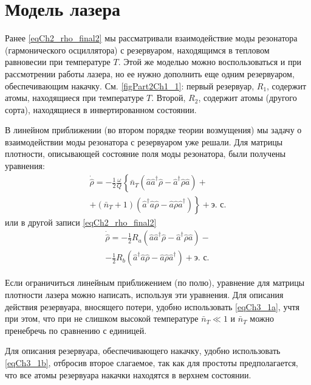 \section{Модель лазера}

Ранее \eqref{eqCh2_rho_final2} мы рассматривали взаимодействие моды резонатора
(гармонического осциллятора) с резервуаром, находящимся в тепловом
равновесии при температуре  $T$.  Этой же моделью можно воспользоваться
и при рассмотрении работы лазера, но ее нужно дополнить еще одним
резервуаром, обеспечивающим накачку.  
См. \autoref{figPart2Ch1_1}: первый резервуар, $R_1$, содержит атомы,
находящиеся при температуре  $T$.  Второй, $R_2$, содержит атомы (другого
сорта), находящиеся в инвертированном состоянии. 



В линейном приближении (во втором порядке теории возмущения) мы задачу
о взаимодействии моды резонатора с резервуаром уже решали. Для матрицы
плотности, описывающей состояние поля моды резонатора, были получены
уравнения:  
\begin{eqnarray}
\dot{\hat{\rho}} =
- \frac{1}{2}\frac{\omega}{Q}\left\{
\bar{n}_T\left(\hat{a}\hat{a}^{\dag}\hat{\rho} - 
\hat{a}^{\dag}\hat{\rho}\hat{a}
\right)\right.
+ 
\nonumber \\
\left.
+ \left(\bar{n}_T + 1\right)
\left(\hat{a}^{\dag}\hat{a}\hat{\rho} - 
\hat{a}\hat{\rho}\hat{a}^{\dag}
\right)
\right\}
 + \mbox{э. с.}
\label{eqCh3_1a}
\end{eqnarray}
или в другой записи \eqref{eqCh2_rho_final2}
\begin{eqnarray}
\dot{\hat{\rho}} =
- \frac{1}{2}R_a
\left(\hat{a}\hat{a}^{\dag}\hat{\rho} - 
\hat{a}^{\dag}\hat{\rho}\hat{a}
\right)
- 
\nonumber \\
- \frac{1}{2}R_b
\left(\hat{a}^{\dag}\hat{a}\hat{\rho} - 
\hat{a}\hat{\rho}\hat{a}^{\dag}
\right)
 + \mbox{э. с.}
\label{eqCh3_1b}
\end{eqnarray}

Если ограничиться линейным приближением (по полю), уравнение для
матрицы плотности лазера можно написать, используя эти уравнения. Для
описания действия резервуара, вносящего потери, удобно использовать
\eqref{eqCh3_1a}, учтя при этом, что при не слишком высокой
температуре $\bar{n}_T \ll 1$  и $\bar{n}_T$
можно пренебречь по сравнению с  единицей.
 
Для описания резервуара, обеспечивающего накачку, удобно использовать
\eqref{eqCh3_1b}, отбросив второе слагаемое, так как для простоты
предполагается, что все атомы резервуара накачки находятся в верхнем
состоянии. 

